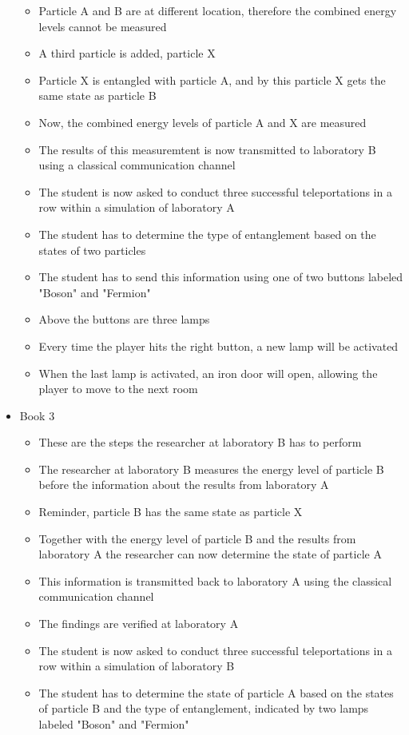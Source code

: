 \documentclass[11pt,twoside]{report} %
\begin{document}
\begin{itemize}
\begin{itemize}
		\item Particle A and B are at different location, therefore the combined energy levels cannot be measured
		\item A third particle is added, particle X
		\item Particle X is entangled with particle A, and by this particle X gets the same state as particle B
		\item Now, the combined energy levels of particle A and X are measured
		\item The results of this measuremtent is now transmitted to laboratory B using a classical communication channel
		\item The student is now asked to conduct three successful teleportations in a row within a simulation of laboratory A
		\item The student has to determine the type of entanglement based on the states of two particles
		\item The student has to send this information using one of two buttons labeled "Boson" and "Fermion"
		\item Above the buttons are three lamps
		\item Every time the player hits the right button, a new lamp will be activated
		\item When the last lamp is activated, an iron door will open, allowing the player to move to the next room
	\end{itemize}
	\item Book 3
	\begin{itemize}
		\item These are the steps the researcher at laboratory B has to perform
		\item The researcher at laboratory B measures the energy level of particle B before the information about the results from laboratory A
		\item Reminder, particle B has the same state as particle X
		\item Together with the energy level of particle B and the results from laboratory A the researcher can now determine the state of particle A
		\item This information is transmitted back to laboratory A using the classical communication channel
		\item The findings are verified at laboratory A
		\item The student is now asked to conduct three successful teleportations in a row within a simulation of laboratory B
		\item The student has to determine the state of particle A based on the states of particle B and the type of entanglement, indicated by two lamps labeled "Boson" and "Fermion"

\end{itemize}
\end{itemize}
\end{document}
